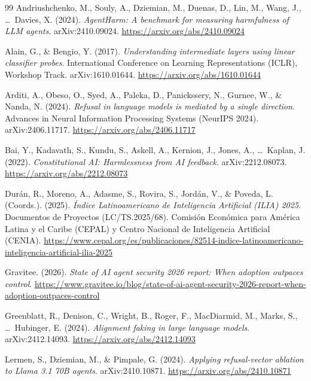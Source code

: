 \documentclass[12pt,a4paper]{article}
\begin{document}
\begin{thebibliography}{99}
\setlength{\itemsep}{0.6em}
%
Andriushchenko, M., Souly, A., Dziemian, M., Duenas, D., Lin, M., Wang, J., \ldots\ Davies, X. (2024). \textit{AgentHarm: A benchmark for measuring harmfulness of LLM agents}. arXiv:2410.09024. \url{https://arxiv.org/abs/2410.09024}

Alain, G., \& Bengio, Y. (2017). \textit{Understanding intermediate layers using linear classifier probes}. International Conference on Learning Representations (ICLR), Workshop Track. arXiv:1610.01644. \url{https://arxiv.org/abs/1610.01644}

Arditi, A., Obeso, O., Syed, A., Paleka, D., Panickssery, N., Gurnee, W., \& Nanda, N. (2024). \textit{Refusal in language models is mediated by a single direction}. Advances in Neural Information Processing Systems (NeurIPS 2024). arXiv:2406.11717. \url{https://arxiv.org/abs/2406.11717}

Bai, Y., Kadavath, S., Kundu, S., Askell, A., Kernion, J., Jones, A., \ldots\ Kaplan, J. (2022). \textit{Constitutional AI: Harmlessness from AI feedback}. arXiv:2212.08073. \url{https://arxiv.org/abs/2212.08073}

Dur\'an, R., Moreno, A., Adasme, S., Rovira, S., Jord\'an, V., \& Poveda, L. (Coords.). (2025). \textit{\'Indice Latinoamericano de Inteligencia Artificial (ILIA) 2025}. Documentos de Proyectos (LC/TS.2025/68). Comisi\'on Econ\'omica para Am\'erica Latina y el Caribe (CEPAL) y Centro Nacional de Inteligencia Artificial (CENIA). \url{https://www.cepal.org/es/publicaciones/82514-indice-latinoamericano-inteligencia-artificial-ilia-2025}

Gravitee. (2026). \textit{State of AI agent security 2026 report: When adoption outpaces control}. \url{https://www.gravitee.io/blog/state-of-ai-agent-security-2026-report-when-adoption-outpaces-control}

Greenblatt, R., Denison, C., Wright, B., Roger, F., MacDiarmid, M., Marks, S., \ldots\ Hubinger, E. (2024). \textit{Alignment faking in large language models}. arXiv:2412.14093. \url{https://arxiv.org/abs/2412.14093}

Lermen, S., Dziemian, M., \& Pimpale, G. (2024). \textit{Applying refusal-vector ablation to Llama 3.1 70B agents}. arXiv:2410.10871. \url{https://arxiv.org/abs/2410.10871}


\end{thebibliography}
\end{document}
